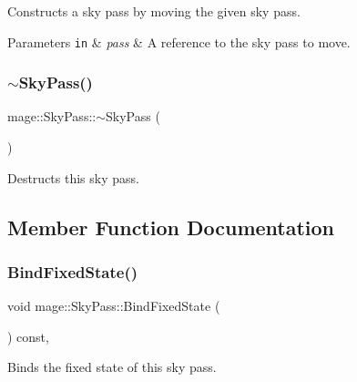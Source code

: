 Constructs a sky pass by moving the given sky pass.


\begin{DoxyParams}[1]{Parameters}
\mbox{\tt in}  & {\em pass} & A reference to the sky pass to move. \\
\hline
\end{DoxyParams}
\hypertarget{classmage_1_1_sky_pass_ab3e581e2eedfc62e13c71d91359f71ce}{}\label{classmage_1_1_sky_pass_ab3e581e2eedfc62e13c71d91359f71ce} 
\subsubsection{\texorpdfstring{$\sim$\+Sky\+Pass()}{~SkyPass()}}
{\footnotesize\ttfamily mage\+::\+Sky\+Pass\+::$\sim$\+Sky\+Pass (\begin{DoxyParamCaption}{ }\end{DoxyParamCaption})\hspace{0.3cm}{\ttfamily [default]}}

Destructs this sky pass. 

\subsection{Member Function Documentation}
\hypertarget{classmage_1_1_sky_pass_aa74c5e32a917aac610b2c7e4750c4639}{}\label{classmage_1_1_sky_pass_aa74c5e32a917aac610b2c7e4750c4639} 
\subsubsection{\texorpdfstring{Bind\+Fixed\+State()}{BindFixedState()}}
{\footnotesize\ttfamily void mage\+::\+Sky\+Pass\+::\+Bind\+Fixed\+State (\begin{DoxyParamCaption}{ }\end{DoxyParamCaption}) const\hspace{0.3cm}{\ttfamily [private]}, {\ttfamily [noexcept]}}

Binds the fixed state of this sky pass. \hypertarget{classmage_1_1_sky_pass_af608935f6cb4b631512ee9c9eb6dec9d}{}\label{classmage_1_1_sky_pass_af608935f6cb4b631512ee9c9eb6dec9d} 
